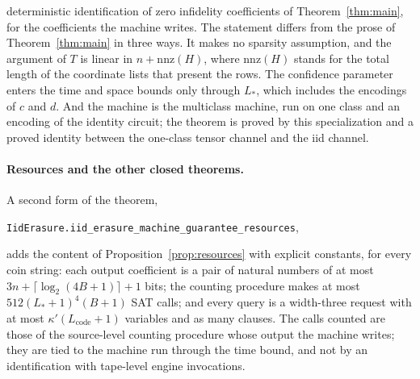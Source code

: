 \documentclass[11pt]{article}
\theoremstyle{remark}
\newcommand{\lean}[1]{\texttt{#1}}
\begin{document}
deterministic identification of zero infidelity coefficients of
Theorem~\ref{thm:main}, for the coefficients the machine writes. The
statement differs from the prose of Theorem~\ref{thm:main} in three
ways. It makes no sparsity assumption, and the argument of \(T\) is
linear in \(n+\mathrm{nnz}(H)\), where \(\mathrm{nnz}(H)\) stands for the
total length of the coordinate lists that present the rows. The
confidence parameter enters the time and space bounds only through
\(L_*\), which includes the encodings of \(c\) and \(d\). And the
machine is the multiclass machine, run on one class and an encoding of
the identity circuit; the theorem is proved by this specialization and a
proved identity between the one-class tensor channel and the iid
channel.

\paragraph{Resources and the other closed theorems.}
A second form of the theorem,
\begin{center}
\lean{IidErasure.iid\_erasure\_machine\_guarantee\_resources},
\end{center}
adds the
content of Proposition~\ref{prop:resources} with explicit constants, for
every coin string: each output coefficient is a pair of natural numbers
of at most \(3n+\lceil\log_2(4B+1)\rceil+1\) bits; the counting
procedure makes at most \(512(L_*+1)^4(B+1)\) SAT calls; and every query
is a width-three request with at most \(\kappa'(L_{\mathrm{code}}+1)\)
variables and as many clauses. The calls counted are those of the
source-level counting procedure whose output the machine writes; they
are tied to the machine run through the time bound, and not by an
identification with tape-level engine invocations.
\end{document}
